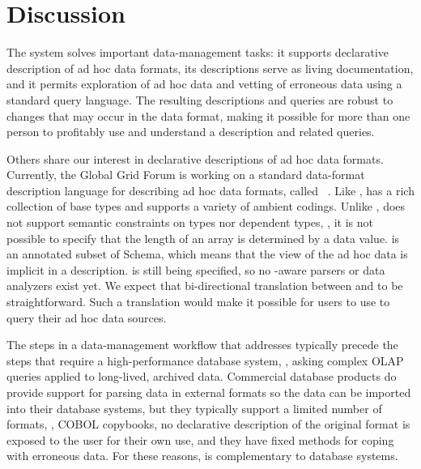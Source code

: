 \section{Discussion}
\label{section:relatedwork}
\label{section:future}

The \pads{} system solves important data-management tasks: it supports
declarative description of ad hoc data formats, its descriptions serve
as living documentation, and it permits exploration of ad hoc data and
vetting of erroneous data using a standard query language.  The
resulting \pads{} descriptions and queries are robust to changes that
may occur in the data format, making it possible for more than one
person to profitably use and understand a \pads{} description and
related queries.

Others share our interest in declarative descriptions of ad hoc data
formats.  Currently, the Global Grid Forum is working on a standard
data-format description language for describing ad hoc data formats,
called \dfdl{}~\cite{dfdl-proposal,dfdl-primer}.  Like \pads{},
\dfdl{} has a rich collection of base types and supports a variety of
ambient codings.  Unlike \pads{}, \dfdl{} does not support semantic
constraints on types nor dependent types, \eg{}, it is not possible to
specify that the length of an array is determined by a data value.
\dfdl{} is an annotated subset of \Xml{} Schema, which means that the
\Xml{} view of the ad hoc data is implicit in a \dfdl{} description.
\dfdl{} is still being specified, so no \dfdl{}-aware parsers or data
analyzers exist yet.  We expect that bi-directional translation
between \pads{} and \dfdl{} to be straightforward.  Such a translation
would make it possible for \dfdl{} users to use \padx{} to query their
ad hoc data sources.


The steps in a data-management workflow that \pads{} addresses
typically precede the steps that require a high-performance database
system, \eg{}, asking complex OLAP queries applied to long-lived,
archived data.  Commercial database products do provide support for
parsing data in external formats so the data can be imported into
their database systems, but they typically support a limited number of
formats, \eg{}, COBOL copybooks, no declarative description of the
original format is exposed to the user for their own use, and they
have fixed methods for coping with erroneous data.  For these reasons,
\pads{} is complementary to database systems.

